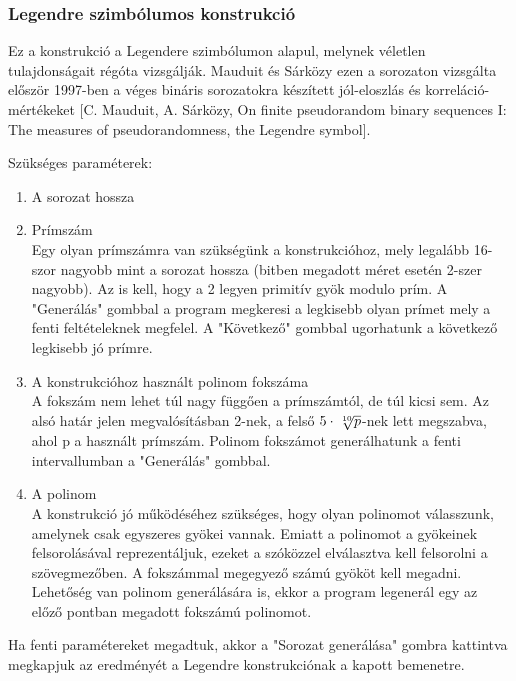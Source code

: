 \documentclass[12pt]{article}
\begin{document}
	\subsubsection{Legendre szimbólumos konstrukció}
		Ez a konstrukció a Legendere szimbólumon alapul, melynek véletlen tulajdonságait régóta vizsgálják. Mauduit és Sárközy ezen a sorozaton vizsgálta először 1997-ben a véges bináris sorozatokra készített jól-eloszlás és korreláció-mértékeket [C. Mauduit, A. Sárközy, On finite pseudorandom binary sequences I: The measures of pseudorandomness, the Legendre symbol].
	\par
	Szükséges paraméterek:
	\begin{enumerate}\bfseries
		\item A sorozat hossza
		\\ 
		\bfseries \item Prímszám
		\\ \normalfont Egy olyan prímszámra van szükségünk a konstrukcióhoz, mely legalább 16-szor nagyobb mint a sorozat hossza (bitben megadott méret esetén 2-szer nagyobb). Az is kell, hogy a 2 legyen primitív gyök modulo prím. A "Generálás" gombbal a program megkeresi a legkisebb olyan prímet mely a fenti feltételeknek megfelel. A "Következő" gombbal ugorhatunk a következő legkisebb jó prímre.
		\bfseries \item A konstrukcióhoz használt polinom fokszáma \\ \normalfont
		A fokszám nem lehet túl nagy függően a prímszámtól, de túl kicsi sem. Az alsó határ jelen megvalósításban 2-nek, a felső $5\cdot\sqrt[\leftroot{-2}\uproot{2}10]{p}$-nek lett megszabva, ahol p a használt prímszám. Polinom fokszámot generálhatunk a fenti intervallumban a "Generálás" gombbal.
		\bfseries \item A polinom \\
		\normalfont
		A konstrukció jó működéséhez szükséges, hogy olyan polinomot válasszunk, amelynek csak egyszeres gyökei vannak. Emiatt a polinomot a gyökeinek felsorolásával reprezentáljuk, ezeket a szóközzel elválasztva kell felsorolni a szövegmezőben. A fokszámmal megegyező számú gyököt kell megadni. Lehetőség van polinom generálására is, ekkor a program legenerál egy az előző pontban megadott fokszámú polinomot.
	\end{enumerate}
	Ha fenti paramétereket megadtuk, akkor a "Sorozat generálása" gombra kattintva megkapjuk az eredményét a Legendre konstrukciónak a kapott bemenetre.
\end{document}
